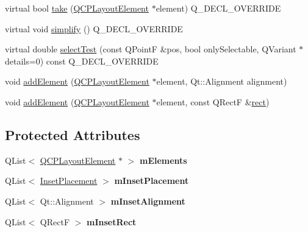 \begin{DoxyCompactItemize}
\item 
virtual bool \hyperlink{class_q_c_p_layout_inset_af7f13cc369f8190b5e7e17d5f39dfe1c}{take} (\hyperlink{class_q_c_p_layout_element}{Q\+C\+P\+Layout\+Element} $\ast$element) Q\+\_\+\+D\+E\+C\+L\+\_\+\+O\+V\+E\+R\+R\+I\+DE
\item 
virtual void \hyperlink{class_q_c_p_layout_inset_a18b7d508f0baa60cc5dcb1343cf7f32a}{simplify} () Q\+\_\+\+D\+E\+C\+L\+\_\+\+O\+V\+E\+R\+R\+I\+DE
\item 
virtual double \hyperlink{class_q_c_p_layout_inset_a2eeef7ea1b8340e7c7c2e2fc229df5ea}{select\+Test} (const Q\+PointF \&pos, bool only\+Selectable, Q\+Variant $\ast$details=0) const Q\+\_\+\+D\+E\+C\+L\+\_\+\+O\+V\+E\+R\+R\+I\+DE
\item 
void \hyperlink{class_q_c_p_layout_inset_ad61529eb576af7f04dff94abb10c745a}{add\+Element} (\hyperlink{class_q_c_p_layout_element}{Q\+C\+P\+Layout\+Element} $\ast$element, Qt\+::\+Alignment alignment)
\item 
void \hyperlink{class_q_c_p_layout_inset_a8ff61fbee4a1f0ff45c398009d9f1e56}{add\+Element} (\hyperlink{class_q_c_p_layout_element}{Q\+C\+P\+Layout\+Element} $\ast$element, const Q\+RectF \&\hyperlink{class_q_c_p_layout_element_a208effccfe2cca4a0eaf9393e60f2dd4}{rect})
\end{DoxyCompactItemize}
\subsection*{Protected Attributes}
\begin{DoxyCompactItemize}
\item 
\mbox{\label{class_q_c_p_layout_inset_a8fff7eae9a1be9a5c1e544fb379f682f}} 
Q\+List$<$ \hyperlink{class_q_c_p_layout_element}{Q\+C\+P\+Layout\+Element} $\ast$ $>$ {\bfseries m\+Elements}
\item 
\mbox{\label{class_q_c_p_layout_inset_a57a0a4e445cc78eada29765ecf092abe}} 
Q\+List$<$ \hyperlink{class_q_c_p_layout_inset_a8b9e17d9a2768293d2a7d72f5e298192}{Inset\+Placement} $>$ {\bfseries m\+Inset\+Placement}
\item 
\mbox{\label{class_q_c_p_layout_inset_a55e9b84c310136ff985a6544184ab64a}} 
Q\+List$<$ Qt\+::\+Alignment $>$ {\bfseries m\+Inset\+Alignment}
\item 
\mbox{\label{class_q_c_p_layout_inset_aaa8f6b5029458f3d97a65239524a2b33}} 
Q\+List$<$ Q\+RectF $>$ {\bfseries m\+Inset\+Rect}
\end{DoxyCompactItemize}
